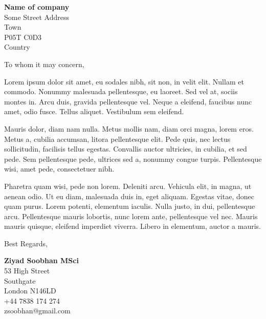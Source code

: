 \documentclass{letter}
\begin{document}
\begin{letter}{\textbf{Name of company}\\
Some Street Address\\
Town\\
P05T C0D3\\
Country\\
}


\opening{To whom it may concern,}


Lorem ipsum dolor sit amet, eu sodales nibh, sit non, in velit elit. Nullam et
commodo. Nonummy malesuada pellentesque, eu laoreet. Sed vel at, sociis montes
in. Arcu duis, gravida pellentesque vel. Neque a eleifend, faucibus nunc amet,
odio fusce. Tellus aliquet. Vestibulum sem eleifend.

Mauris dolor, diam nam nulla. Metus mollis nam, diam orci magna, lorem eros.
Metus a, cubilia accumsan, litora pellentesque elit. Pede quis, nec lectus
sollicitudin, facilisis tellus egestas. Convallis auctor ultricies, in cubilia,
 et sed pede. Sem pellentesque pede, ultrices sed a, nonummy congue turpis.
Pellentesque wisi, amet pede, consectetuer nibh.

Pharetra quam wisi, pede non lorem. Deleniti arcu. Vehicula elit, in magna, ut
aenean odio. Ut eu diam, malesuada duis in, eget aliquam. Egestas vitae, donec
quam purus. Lorem potenti, elementum iaculis. Nulla justo, in dui, pellentesque
 arcu. Pellentesque mauris lobortis, nunc lorem ante, pellentesque vel nec.
Mauris mauris quisque, eleifend imperdiet viverra. Libero in elementum, auctor
a mauris.



\closing{Best Regards,
}

\textbf{Ziyad Soobhan MSci}\\
53 High Street\\
Southgate\\
London N146LD\\
+44 7838 174 274\\ zsoobhan@gmail.com\\
\end{letter}
\end{document}
